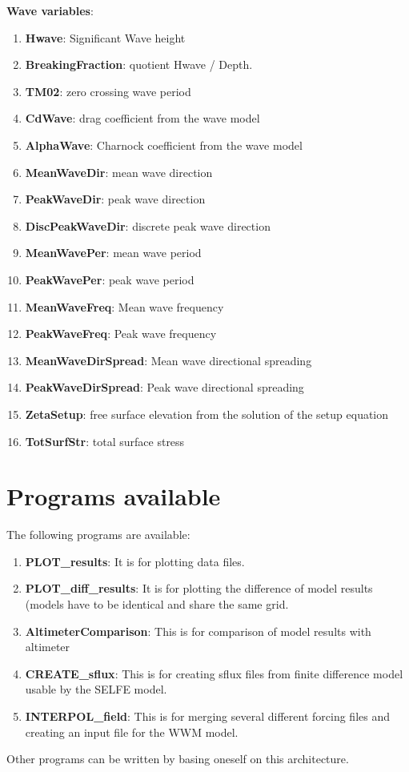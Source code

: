 \documentclass[12pt]{amsart}
\begin{document}
{\bf Wave variables}:
\begin{enumerate}
\item {\bf Hwave}: Significant Wave height
\item {\bf BreakingFraction}: quotient Hwave / Depth.
\item {\bf TM02}: zero crossing wave period
\item {\bf CdWave}: drag coefficient from the wave model
\item {\bf AlphaWave}: Charnock coefficient from the wave model
\item {\bf MeanWaveDir}: mean wave direction
\item {\bf PeakWaveDir}: peak wave direction
\item {\bf DiscPeakWaveDir}: discrete peak wave direction
\item {\bf MeanWavePer}: mean wave period
\item {\bf PeakWavePer}: peak wave period
\item {\bf MeanWaveFreq}: Mean wave frequency
\item {\bf PeakWaveFreq}: Peak wave frequency
\item {\bf MeanWaveDirSpread}: Mean wave directional spreading
\item {\bf PeakWaveDirSpread}: Peak wave directional spreading
\item {\bf ZetaSetup}: free surface elevation from the solution of the setup equation
\item {\bf TotSurfStr}: total surface stress
\end{enumerate}







\section{Programs available}

The following programs are available:
\begin{enumerate}
\item {\bf PLOT\_results}: It is for plotting data files.
\item {\bf PLOT\_diff\_results}: It is for plotting the difference of model results (models have to be identical and share the same grid.
\item {\bf AltimeterComparison}: This is for comparison of model results with altimeter
\item {\bf CREATE\_sflux}: This is for creating sflux files from finite difference model usable by the SELFE model.
\item {\bf INTERPOL\_field}: This is for merging several different forcing files and creating an input file for the WWM model.
\end{enumerate}
Other programs can be written by basing oneself on this architecture.
\end{document}
